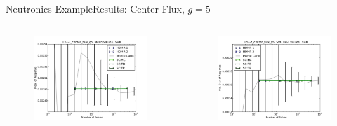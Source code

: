 \documentclass{beamer}
\begin{document}
\begin{frame}{Neutronics Example}{Results: Center Flux, $g=5$}%
  \begin{columns}
    \begin{column}{0.5\textwidth}
      \begin{figure}
        \centering
        \includegraphics[width=\linewidth]{c5g7/C5G7_center_flux_g5_mean_vals}
      \end{figure}
    \end{column}
    \begin{column}{0.5\textwidth}
      \begin{figure}
        \centering
        \includegraphics[width=\linewidth]{c5g7/C5G7_center_flux_g5_var_vals}
      \end{figure}
    \end{column}
  \end{columns}
\end{frame}
\end{document}

